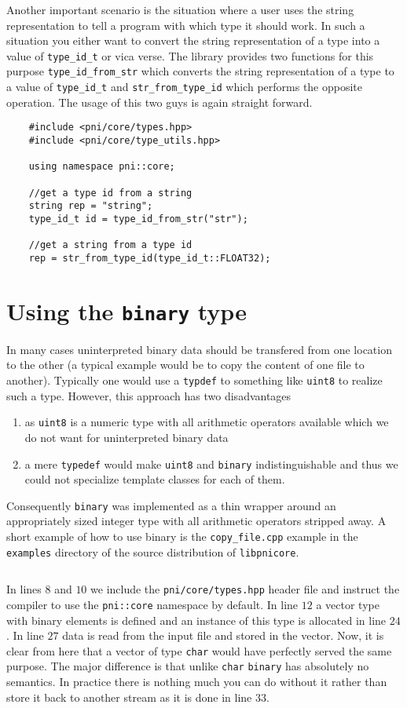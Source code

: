 Another important scenario is the situation where a user uses the string
representation to tell a program with which type it should work. 
In such a situation you either want to convert the string representation of a
type into a value of {\tt type\_id\_t} or vica verse. The library provides two
functions for this purpose {\tt type\_id\_from\_str} which converts the string
representation of a type to a value of {\tt type\_id\_t} and 
{\tt str\_from\_type\_id} which performs the opposite operation. 
The usage of this two guys is again straight forward.
\begin{verbatim}
    #include <pni/core/types.hpp>
    #include <pni/core/type_utils.hpp>

    using namespace pni::core;

    //get a type id from a string
    string rep = "string";
    type_id_t id = type_id_from_str("str");

    //get a string from a type id
    rep = str_from_type_id(type_id_t::FLOAT32);
\end{verbatim}


\section{Using the {\tt binary} type}\label{section:using_binary}

In many cases uninterpreted binary data should be transfered from one location
to the other (a typical example would be to copy the content of one file to
another).
Typically one would use a {\tt typdef} to something like {\tt uint8} to realize
such a type. However, this approach has two disadvantages
\begin{enumerate}
\item as {\tt uint8} is a numeric type with all arithmetic operators available
which we do not want for uninterpreted binary data 
\item a mere {\tt typedef} would make {\tt uint8} and {\tt binary} 
indistinguishable and thus we could not specialize template classes for each of
them.
\end{enumerate}
Consequently {\tt binary} was implemented as a thin wrapper around an
appropriately sized integer type with all arithmetic operators stripped away.
A short example of how to use binary is the {\tt copy\_file.cpp} example in the
{\tt examples} directory of the source distribution of {\tt libpnicore}. 

\inputminted[linenos,
             firstline=24,
             frame=lines,
             label=examples/copy\_file.cpp]
{cpp}{../examples/copy_file.cpp}

In lines $8$ and $10$ we include the {\tt pni/core/types.hpp} header file and
instruct the compiler to use the {\tt pni::core} namespace by default. In line
$12$ a vector type with binary elements is defined and an instance of this type
is allocated in line $24$. 
In line $27$ data is read from the input file and stored in the vector. Now, it
is clear from here that a vector of type  {\tt char} would have perfectly served
the same purpose. The major difference is that unlike {\tt char} {\tt binary}
has absolutely no semantics. In practice there is nothing much you can do
without it rather than store it back to another stream as it is done in 
line $33$.
